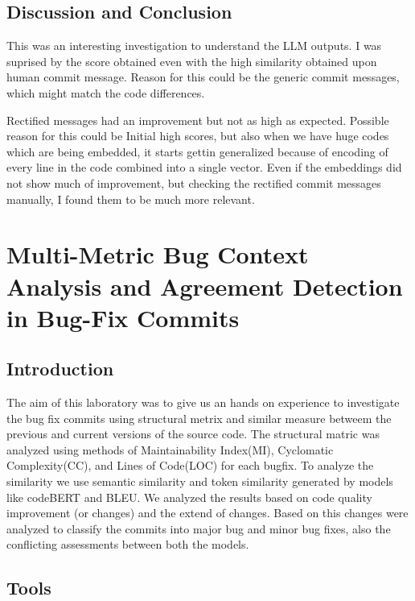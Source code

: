 \documentclass[12pt, a4paper]{report}
\begin{document}
\section{Discussion and Conclusion}

This was an interesting investigation to understand the LLM outputs. I was suprised by the score obtained even with the high similarity obtained upon human commit message. 
Reason for this could be the generic commit messages, which might match the code differences. 

Rectified messages had an improvement but not as high as expected. Possible reason for this could be Initial high scores, but also when we have huge codes which are being embedded, it starts gettin generalized because of encoding of every line in the code combined into a single vector.
Even if the embeddings did not show much of improvement, but checking the rectified commit messages manually, I found them to be much more relevant.

\chapter{Multi-Metric Bug Context Analysis and Agreement Detection in Bug-Fix Commits}
\section{Introduction}

The aim of this laboratory was to give us an hands on experience to investigate the bug fix commits using structural metrix and similar measure betweem the previous and current versions of the source code.
The structural matric was analyzed using methods of Maintainability Index(MI), Cyclomatic Complexity(CC), and Lines of Code(LOC) for each bugfix. To analyze the similarity we use semantic similarity and token similarity generated by models like codeBERT and BLEU. 
We analyzed the results based on code quality improvement (or changes) and the extend of changes. Based on this changes were analyzed to classify the commits into major bug and minor bug fixes, also the conflicting assessments between both the models.


\section{Tools}
\end{document}
